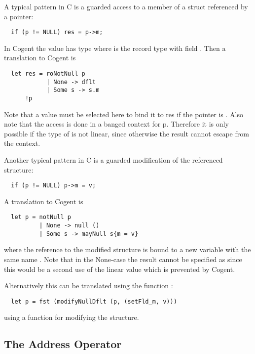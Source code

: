 A typical pattern in C is a guarded access to a member of a struct referenced by a pointer:
\begin{verbatim}
  if (p != NULL) res = p->m;
\end{verbatim}
In Cogent the value  has type  where  is the record type with field . 
Then a translation to Cogent is
\begin{verbatim}
  let res = roNotNull p 
            | None -> dflt
            | Some s -> s.m
      !p
\end{verbatim}
Note that a value  must be selected here to bind it to res if the pointer is . Also note that the access is
done in a banged context for p. Therefore it is only possible if the type of  is not linear, since otherwise the result
cannot escape from the context.

Another typical pattern in C is a guarded modification of the referenced structure:
\begin{verbatim}
  if (p != NULL) p->m = v;
\end{verbatim}
A translation to Cogent is
\begin{verbatim}
  let p = notNull p 
          | None -> null ()
          | Some s -> mayNull s{m = v}
\end{verbatim}
where the reference to the modified structure is bound to a new variable with the same name . 
Note that in the None-case the result cannot be specified as 
 since this would be a second use of the linear value  which is prevented by Cogent.

Alternatively this can be translated using the function :
\begin{verbatim}
  let p = fst (modifyNullDflt (p, (setFld_m, v)))
\end{verbatim}
using a function  for modifying the structure.

\subsection{The Address Operator \code{\&}}
\label{app-transfunction-addrop}

